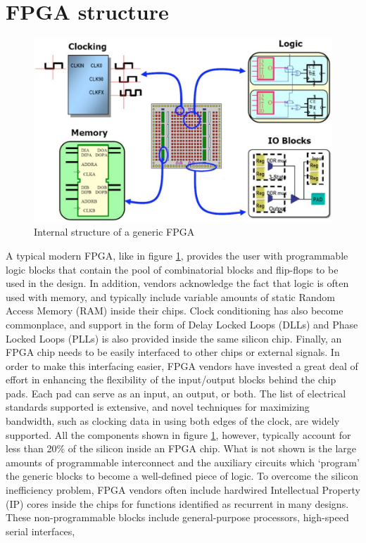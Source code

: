 \section{FPGA structure}
\begin{figure}[H]
	\centering
	\includegraphics[width=0.7\linewidth]{IMG/ch3/FPGA2}
	\caption{Internal structure of a generic FPGA}
	\label{fig:fpga2}
\end{figure}
\noindent A typical modern FPGA, like in figure \ref{fig:fpga2}, provides the user with programmable logic blocks that
contain the pool of combinatorial blocks and flip-flops to be used in the design. In addition, vendors
acknowledge the fact that logic is often used with memory, and typically include
variable amounts of static Random Access Memory (RAM) inside their chips. Clock conditioning has
also become commonplace, and support in the form of Delay Locked Loops (DLLs) and Phase Locked
Loops (PLLs) is also provided inside the same silicon chip. Finally, an FPGA chip needs to be easily interfaced to other chips or
external signals. In order to make this interfacing easier, FPGA vendors have invested a great deal of
effort in enhancing the flexibility of the input/output blocks behind the chip pads. Each pad can serve
as an input, an output, or both. The list of electrical standards supported is extensive, and novel
techniques for maximizing bandwidth, such as clocking data in using both edges of the clock, are
widely supported.
\newline
All the components shown in figure \ref{fig:fpga2}, however, typically account for less than 20\% of the silicon
inside an FPGA chip. What is not shown is the large amounts of programmable interconnect and the
auxiliary circuits which ‘program’ the generic blocks to become a well-defined piece of logic.
To overcome the silicon inefficiency problem, FPGA vendors often include hardwired
Intellectual Property (IP) cores inside the chips for functions identified as recurrent in many designs.
These non-programmable blocks include general-purpose processors, high-speed serial interfaces,
